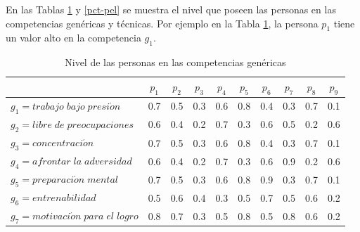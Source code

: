 
En las Tablas \ref{pcg-pel} y \ref{pct-pel} se muestra el nivel que poseen las personas en las competencias genéricas y técnicas. Por ejemplo en la Tabla \ref{pcg-pel}, la persona $ p_1 $ tiene un valor alto en la competencia $ g_1 $.

\begin{table}[H]
	\centering
	\caption{Nivel de las personas en las competencias genéricas}\label{pcg-pel}
	\begin{tabular}{|l|c|c|c|c|c|c|c|c|c|}
		\hline
		\thead{$F_g(g,p)$} & $p_1$ & $p_2$ & $p_3$ & $p_4$ & $p_5$ & $p_6$ & $p_7$ & $p_8$ & $p_9$ \\ \hline  
		$g_1=trabajo\;bajo\;presi\acute{o}n$ 	& 0.7 & 0.5 & 0.3 & 0.6 & 0.8 & 0.4 & 0.3 & 0.7 & 0.1 \\ \hline
		$g_2=libre\;de\;preocupaciones$  	& 0.6 & 0.4 & 0.2 & 0.7 & 0.3 & 0.6 & 0.5 & 0.2 & 0.6 \\ \hline
		$g_3=concentraci\acute{o}n$ 	& 0.7 & 0.5 & 0.3 & 0.6 & 0.8 & 0.4 & 0.3 & 0.7 & 0.1 \\ \hline
		$g_4=afrontar\;la\;adversidad$  	& 0.6 & 0.4 & 0.2 & 0.7 & 0.3 & 0.6 & 0.9 & 0.2 & 0.6 \\ \hline
		$g_5=preparaci\acute{o}n\;mental$ 	& 0.7 & 0.5 & 0.3 & 0.6 & 0.8 & 0.9 & 0.3 & 0.7 & 0.1 \\ \hline
		$g_6=entrenabilidad$ 	& 0.5 & 0.6 & 0.4 & 0.3 & 0.5 & 0.7 & 0.5 & 0.6 & 0.2 \\ \hline
		$g_7=motivaci\acute{o}n\;para\;el\;logro$  	& 0.8 & 0.7 & 0.3 & 0.5 & 0.8 & 0.5 & 0.8 & 0.6 & 0.2 \\ \hline
		
	\end{tabular}
\end{table}

